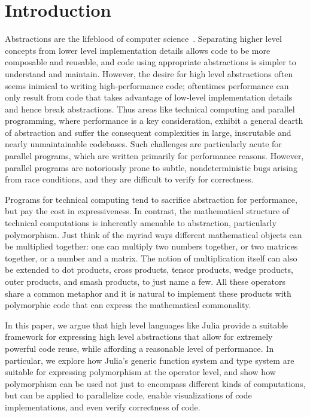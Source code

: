 \documentclass{sig-alternate}
\begin{document}


\section{Introduction}

Abstractions are the lifeblood of computer science~\cite{Abelson1996}.
Separating higher level concepts from lower level implementation details allows
code to be more composable and reusable, and code using appropriate
abstractions is simpler to understand and maintain. However, the desire for
high level abstractions often seems inimical to writing high-performance code;
oftentimes performance can only result from code that takes advantage of
low-level implementation details and hence break abstractions. Thus areas like
technical computing and parallel programming, where performance is a key
consideration, exhibit a general dearth of abstraction and suffer the
consequent complexities in large, inscrutable and nearly unmaintainable
codebases. Such challenges are particularly acute for parallel programs, which
are written primarily for performance reasons. However, parallel programs are
notoriously prone to subtle, nondeterministic bugs arising from race
conditions, and they are difficult to verify for correctness. 

Programs for technical computing tend to sacrifice abstraction for performance,
but pay the cost in expressiveness. In contrast, the mathematical structure of
technical computations is inherently amenable to abstraction, particularly
polymorphism. Just think of the myriad ways different mathematical objects can
be multiplied together: one can multiply two numbers together, or two matrices
together, or a number and a matrix. The notion of multiplication itself can
also be extended to dot products, cross products, tensor products, wedge
products, outer products, and smash products, to just name a few. All these
operators share a common metaphor and it is natural to implement these products
with polymorphic code that can express the mathematical commonality.

In this paper, we argue that high level languages like Julia provide a suitable
framework for expressing high level abstractions that allow for extremely
powerful code reuse, while affording a reasonable level of performance.
In particular, we explore how Julia's generic function system and type system
are suitable for expressing polymorphism at the operator level, and show
how polymorphism can be used not just to encompass different kinds of
computations, but can be applied to parallelize code, enable visualizations of
code implementations, and even verify correctness of code.
\end{document}
